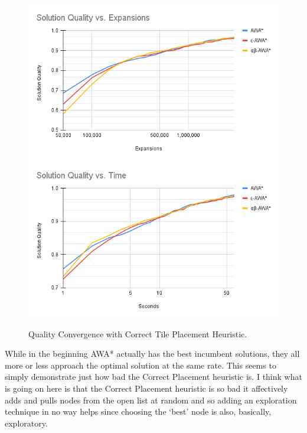 \begin{figure}
    \includegraphics[width=\linewidth]{media/correct-Solution Quality vs. Expansions.png}
    \includegraphics[width=\linewidth]{media/correct-Solution Quality vs. Time.png}
    \caption{Quality Convergence with Correct Tile Placement Heuristic.} \label{fig:conv-correct}
\end{figure}

While in the beginning AWA* actually has the best incumbent solutions, they all more or less approach the optimal solution at the same rate. This seems to simply demonstrate just how bad the Correct Placement heuristic is. I think what is going on here is that the Correct Placement heuristic is so bad it affectively adds and pulls nodes from the open list at random and so adding an exploration technique in no way helps since choosing the `best' node is also, basically, exploratory.


